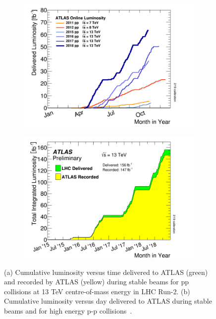 \begin{figure}[]
    \centering
    \begin{subfigure}[b]{0.49\textwidth}
        \centering
        \includegraphics[width=\textwidth]{images/intlumivsyear.png}
        \caption{}
        \label{fig:method:Lumi:lumirun2year}
    \end{subfigure}
    \begin{subfigure}[b]{0.49\textwidth}
        \centering
        \includegraphics[width=\textwidth]{images/intlumivstimeRun2.png}
        \caption{}
        \label{fig:method:Lumi:lumiRun2vsatlas}
    \end{subfigure}
    \caption[Total Integrated Luminosity at Run-2 (13 TeV pp data only);
    Delivered Luminosity versus time for 2011-2018 (p-p data only)]{(a) Cumulative luminosity versus time delivered to ATLAS (green) and recorded by ATLAS (yellow) during stable beams for pp collisions at 13 TeV centre-of-mass energy in LHC Run-2. (b) Cumulative luminosity versus day delivered to ATLAS during stable beams and for high energy p-p collisions~\cite{ATLAS:lumiPlots}.}
    \label{}
\end{figure}

\clearpage